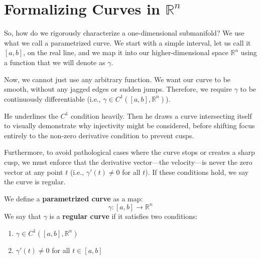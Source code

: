 
\section{Formalizing Curves in \texorpdfstring{$\mathbb{R}^n$}{Rn}}    

\begin{spoken-clean}[00:04:20 - 00:05:18]
So, how do we rigorously characterize a one-dimensional submanifold? We use what we call a parametrized curve. We start with a simple interval, let us call it $[a, b]$, on the real line, and we map it into our higher-dimensional space $\mathbb{R}^n$ using a function that we will denote as $\gamma$. 

Now, we cannot just use any arbitrary function. We want our curve to be smooth, without any jagged edges or sudden jumps. Therefore, we require $\gamma$ to be continuously differentiable (i.e., $\gamma \in C^1([a, b], \mathbb{R}^n)$).
\end{spoken-clean}

\begin{nice-box}
He underlines the $C^1$ condition heavily. Then he draws a curve intersecting itself to visually demonstrate why injectivity might be considered, before shifting focus entirely to the non-zero derivative condition to prevent cusps.
\end{nice-box}

\begin{spoken-clean}[00:05:18 - 00:06:10]
Furthermore, to avoid pathological cases where the curve stops or creates a sharp cusp, we must enforce that the derivative vector—the velocity—is never the zero vector at any point $t$ (i.e., $\gamma'(t) \neq 0$ for all $t$). If these conditions hold, we say the curve is regular.
\end{spoken-clean}

\begin{math-stroke}
We define a \textbf{parametrized curve} as a map:
\[
\gamma: [a, b] \to \mathbb{R}^n
\]
We say that $\gamma$ is a \textbf{regular curve} if it satisfies two conditions:
\begin{enumerate}
    \item $\gamma \in C^1([a, b], \mathbb{R}^n)$ 
    \item $\gamma'(t) \neq 0$ for all $t \in [a, b]$ 
\end{enumerate}
\end{math-stroke}

